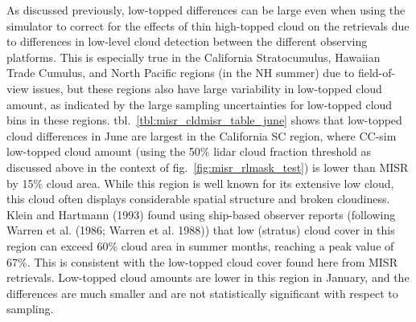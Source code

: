 As discussed previously, low-topped differences can be large even when
using the simulator to correct for the effects of thin high-topped cloud
on the retrievals due to differences in low-level cloud detection
between the different observing platforms. This is especially true in
the California Stratocumulus, Hawaiian Trade Cumulus, and North Pacific
regions (in the NH summer) due to field-of-view issues, but these
regions also have large variability in low-topped cloud amount, as
indicated by the large sampling uncertainties for low-topped cloud bins
in these regions. tbl.~\ref{tbl:misr_cldmisr_table_june} shows that
low-topped cloud differences in June are largest in the California SC
region, where CC-sim low-topped cloud amount (using the 50\% lidar cloud
fraction threshold as discussed above in the context of
fig.~\ref{fig:misr_rlmask_test}) is lower than MISR by 15\% cloud area.
While this region is well known for its extensive low cloud, this cloud
often displays considerable spatial structure and broken cloudiness.
Klein and Hartmann (1993) found using ship-based observer reports
(following Warren et al. (1986; Warren et al. 1988)) that low (stratus)
cloud cover in this region can exceed 60\% cloud area in summer months,
reaching a peak value of 67\%. This is consistent with the low-topped
cloud cover found here from MISR retrievals. Low-topped cloud amounts
are lower in this region in January, and the differences are much
smaller and are not statistically significant with respect to sampling.

